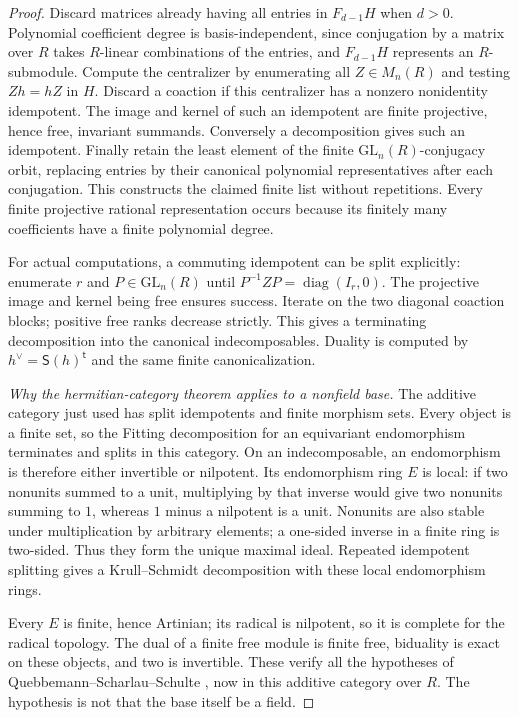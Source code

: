 \begin{proof}
Discard matrices already having all entries in $F_{d-1}H$ when
$d>0$. Polynomial coefficient degree is basis-independent, since
conjugation by a matrix over $R$ takes $R$-linear combinations
of the entries, and $F_{d-1}H$ represents an $R$-submodule.
Compute the centralizer by enumerating all $Z\in M_n(R)$ and
testing $Zh=hZ$ in $H$. Discard a coaction if this centralizer
has a nonzero nonidentity idempotent. The image and kernel of such
an idempotent are finite projective, hence free, invariant
summands. Conversely a decomposition gives such an idempotent.
Finally retain the least element of the finite
$\mathrm{GL}_n(R)$-conjugacy orbit, replacing entries by their
canonical polynomial representatives after each conjugation.
This constructs the claimed finite list without repetitions.
Every finite projective rational representation occurs because
its finitely many coefficients have a finite polynomial degree.

For actual computations, a commuting idempotent can be split
explicitly: enumerate $r$ and $P\in\mathrm{GL}_n(R)$ until
$P^{-1}ZP=\operatorname{diag}(I_r,0)$. The projective image and
kernel being free ensures success. Iterate on the two diagonal
coaction blocks; positive free ranks decrease strictly. This gives
a terminating decomposition into the canonical indecomposables.
Duality is computed by $h^\vee=\mathsf S(h)^{\mathsf t}$ and the
same finite canonicalization.

\emph{Why the hermitian-category theorem applies to a nonfield base.}
The additive category just used has split idempotents and finite
morphism sets. Every object is a finite set, so the Fitting
decomposition for an equivariant endomorphism terminates and
splits in this category. On an indecomposable, an endomorphism
is therefore either invertible or nilpotent. Its endomorphism
ring $E$ is local: if two nonunits summed to a unit, multiplying
by that inverse would give two nonunits summing to $1$, whereas
$1$ minus a nilpotent is a unit. Nonunits are also stable under
multiplication by arbitrary elements; a one-sided inverse in
a finite ring is two-sided. Thus they form the unique maximal
ideal. Repeated idempotent splitting gives a Krull--Schmidt
decomposition with these local endomorphism rings.

Every $E$ is finite, hence Artinian; its radical is nilpotent,
so it is complete for the radical topology. The dual of a finite
free module is finite free, biduality is exact on these objects,
and two is invertible. These verify all the hypotheses of
Quebbemann--Scharlau--Schulte
\cite[Propositions 2.4--2.5, p.271; Theorems 3.2--3.3,
pp.272--273]{C-QSS1979}, now in this additive category over $R$.
The hypothesis is not that the base itself be a field.


\end{proof}

